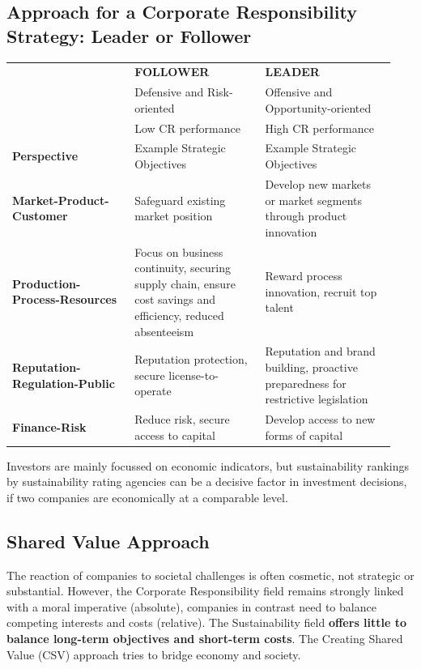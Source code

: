 \documentclass[11pt]{article}
\theoremstyle{definition}
\begin{document}
\subsection{Approach for a Corporate Responsibility Strategy: Leader or Follower}
\begin{tabularx}{\linewidth}{>{\raggedright}p{0.3\linewidth} >{\raggedright}p{0.32\linewidth} >{\raggedleft\arraybackslash}p{0.32\linewidth}}
	& \cellcolor{SteelBlue1!75} \textbf{FOLLOWER} & \cellcolor{SteelBlue1!75} \textbf{LEADER}\\
	& \cellcolor{SteelBlue1!75} Defensive and Risk-oriented & \cellcolor{SteelBlue1!75} Offensive and Opportunity-oriented\\
	& \cellcolor{SteelBlue1!75} Low CR performance & \cellcolor{SteelBlue1!75} High CR performance\\[1em]
	\cellcolor{DodgerBlue1!25} \textbf{Perspective} & \cellcolor{DodgerBlue1!25} Example Strategic Objectives & \cellcolor{DodgerBlue1!25} Example Strategic Objectives\\[1em]
	\cellcolor{DodgerBlue1!25} \textbf{Market-Product-Customer} & Safeguard existing market position & Develop new markets or market segments through product innovation\\[1em]
	\cellcolor{DodgerBlue1!25} \textbf{Production-Process-Resources} & Focus on business continuity, securing supply chain, ensure cost savings and efficiency, reduced absenteeism & Reward process innovation, recruit top talent\\[1em]
	\cellcolor{DodgerBlue1!25} \textbf{Reputation-Regulation-Public} & Reputation protection, secure license-to-operate & Reputation and brand building, proactive preparedness for restrictive legislation\\[1em]
	\cellcolor{DodgerBlue1!25} \textbf{Finance-Risk} & Reduce risk, secure access to capital & Develop access to new forms of capital\\[1em]
\end{tabularx}
Investors are mainly focussed on economic indicators, but sustainability rankings by sustainability rating agencies can be a decisive factor in investment decisions, if two companies are economically at a comparable level.

\subsection{Shared Value Approach}
The reaction of companies to societal challenges is often cosmetic, not strategic or substantial. However, the Corporate Responsibility field remains strongly linked with a moral imperative (absolute), companies in contrast need to balance competing interests and costs (relative). The Sustainability field \textbf{offers little to balance long-term objectives and short-term costs}. The Creating Shared Value (CSV) approach tries to bridge economy and society.
\end{document}
